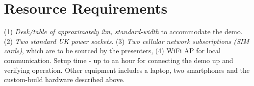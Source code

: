 \documentclass{sig-alternate-10pt}
\begin{document}

\section*{Resource Requirements}

(1) \emph{Desk/table of approximately 2m, standard-width} to accommodate the demo. (2) \emph{Two standard UK power sockets}. (3) \emph{Two cellular network subscriptions (SIM cards)}, which are to be sourced by the presenters, (4) WiFi AP for local communication. Setup time - up to an hour for connecting the demo up and verifying operation. Other equipment includes a laptop, two smartphones and the custom-build hardware described above.


{\footnotesize 


}

%
\end{document}
